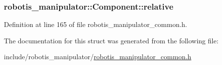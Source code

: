 \subsubsection[{\texorpdfstring{relative}{relative}}]{ robotis\+\_\+manipulator\+::\+Component\+::relative}\hypertarget{structrobotis__manipulator_1_1_component_af1b86e91e0f92a214fa9e10464aba08f}{}\label{structrobotis__manipulator_1_1_component_af1b86e91e0f92a214fa9e10464aba08f}


Definition at line 165 of file robotis\+\_\+manipulator\+\_\+common.\+h.



The documentation for this struct was generated from the following file\+:\begin{DoxyCompactItemize}
\item 
include/robotis\+\_\+manipulator/\hyperlink{robotis__manipulator__common_8h}{robotis\+\_\+manipulator\+\_\+common.\+h}\end{DoxyCompactItemize}
